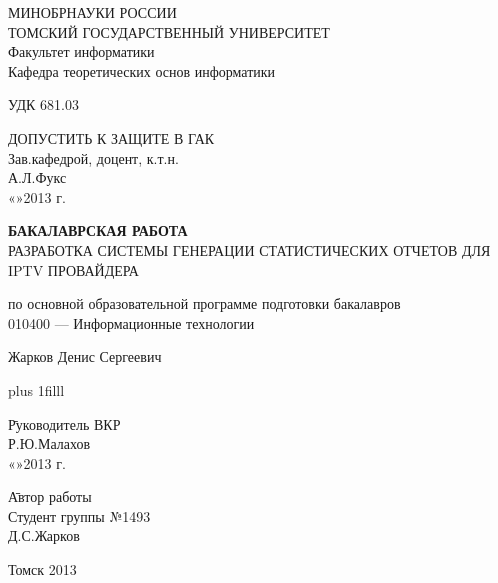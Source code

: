 \Large
\thispagestyle{empty}
\begin{center}
МИНОБРНАУКИ РОССИИ\\
ТОМСКИЙ ГОСУДАРСТВЕННЫЙ УНИВЕРСИТЕТ\\
Факультет информатики\\
Кафедра теоретических основ информатики\\
\end{center}

УДК 681.03

\vspace{0.5cm}

\begin{flushright}
ДОПУСТИТЬ К ЗАЩИТЕ В ГАК\\
Зав.кафедрой, доцент, к.т.н.\\
\makebox[3cm]{\hrulefill}А.Л.Фукс\\
«\makebox[0.8cm]{\hrulefill}»\makebox[1.5cm]{\hrulefill}2013 г.\\
\end{flushright}



\begin{center}

\vspace{1.5cm}
{\bf БАКАЛАВРСКАЯ РАБОТА}\\
\vspace{0.5cm}
РАЗРАБОТКА СИСТЕМЫ ГЕНЕРАЦИИ СТАТИСТИЧЕСКИХ ОТЧЕТОВ ДЛЯ IPTV ПРОВАЙДЕРА

\vspace{0.5cm}
по основной образовательной программе подготовки бакалавров\\
010400 --- Информационные технологии

\vspace{0.5cm}

Жарков Денис Сергеевич


\end{center}

\vskip 0pt plus 1filll

\begin{tabbing}
\hspace{10cm}\=Руководитель ВКР\\
\>\makebox[3cm]{\hrulefill}Р.Ю.Малахов\\
\>«\makebox[0.8cm]{\hrulefill}»\makebox[1.5cm]{\hrulefill}2013 г.\\
\end{tabbing}

\begin{tabbing}
\hspace{10cm}\=Автор работы\\
\>Студент группы №1493\\
\>\makebox[3cm]{\hrulefill}Д.С.Жарков\\
\end{tabbing}

\vspace*{1cm}

\begin{center}
Томск 2013
\end{center}
\normalsize
